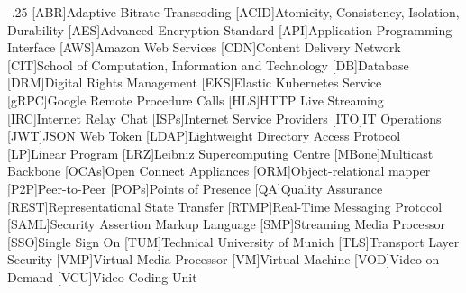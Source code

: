 \documentclass[headsepline,footsepline,footinclude=false,oneside,fontsize=11pt,paper=a4,listof=totoc,bibliography=totoc]{scrbook} %
\begin{document}


\frontmatter{}





\tableofcontents{}

\mainmatter{}






%





\appendix{}


\begin{acronym}
	\itemsep-.25\baselineskip
    [ABR]{Adaptive Bitrate Transcoding}
    [ACID]{Atomicity, Consistency, Isolation, Durability}
    [AES]{Advanced Encryption Standard}
    [API]{Application Programming Interface}
    [AWS]{Amazon Web Services}
    [CDN]{Content Delivery Network}
    [CIT]{School of Computation, Information and Technology}
    [DB]{Database}
    [DRM]{Digital Rights Management}
    [EKS]{Elastic Kubernetes Service}
    [gRPC]{Google Remote Procedure Calls}
    [HLS]{HTTP Live Streaming}
    [IRC]{Internet Relay Chat}
    [ISPs]{Internet Service Providers}
    [ITO]{IT Operations}
    [JWT]{JSON Web Token}
    [LDAP]{Lightweight Directory Access Protocol}
    [LP]{Linear Program}
    [LRZ]{Leibniz Supercomputing Centre}
    [MBone]{Multicast Backbone}
    [OCAs]{Open Connect Appliances}
    [ORM]{Object-relational mapper}
    [P2P]{Peer-to-Peer}
    [POPs]{Points of Presence}
    [QA]{Quality Assurance}
    [REST]{Representational State Transfer}
    [RTMP]{Real-Time Messaging Protocol}
    [SAML]{Security Assertion Markup Language}
    [SMP]{Streaming Media Processor}
    [SSO]{Single Sign On}
    [TUM]{Technical University of Munich}
    [TLS]{Transport Layer Security}
    [VMP]{Virtual Media Processor}
    [VM]{Virtual Machine}
    [VOD]{Video on Demand}
    [VCU]{Video Coding Unit}
    
\end{acronym}

\listoffigures{}
\listoftables{}
\printbibliography{}
\end{document}
